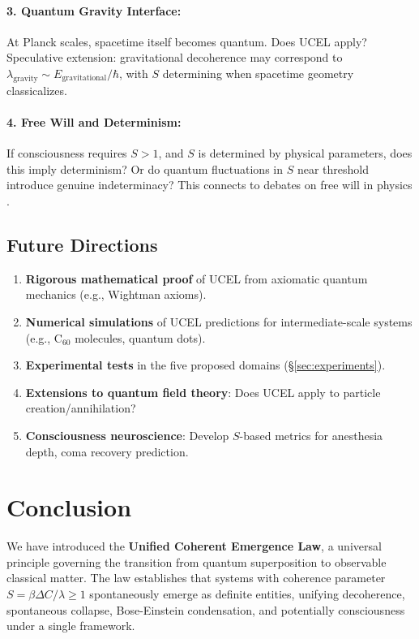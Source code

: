 \documentclass[12pt,a4paper]{article}
\begin{document}
\paragraph{3. Quantum Gravity Interface:}
At Planck scales, spacetime itself becomes quantum. Does UCEL apply? Speculative extension: gravitational decoherence \citep{penrose1996} may correspond to $\lambda_{\text{gravity}} \sim E_{\text{gravitational}} / \hbar$, with $S$ determining when spacetime geometry classicalizes.

\paragraph{4. Free Will and Determinism:}
If consciousness requires $S > 1$, and $S$ is determined by physical parameters, does this imply determinism? Or do quantum fluctuations in $S$ near threshold introduce genuine indeterminacy? This connects to debates on free will in physics \citep{conway2006}.

\subsection{Future Directions}

\begin{enumerate}
    \item \textbf{Rigorous mathematical proof} of UCEL from axiomatic quantum mechanics (e.g., Wightman axioms).
    \item \textbf{Numerical simulations} of UCEL predictions for intermediate-scale systems (e.g., C$_{60}$ molecules, quantum dots).
    \item \textbf{Experimental tests} in the five proposed domains (\S\ref{sec:experiments}).
    \item \textbf{Extensions to quantum field theory}: Does UCEL apply to particle creation/annihilation?
    \item \textbf{Consciousness neuroscience}: Develop $S$-based metrics for anesthesia depth, coma recovery prediction.
\end{enumerate}

\section{Conclusion}

We have introduced the \textbf{Unified Coherent Emergence Law}, a universal principle governing the transition from quantum superposition to observable classical matter. The law establishes that systems with coherence parameter $S = \beta \Delta C / \lambda \geq 1$ spontaneously emerge as definite entities, unifying decoherence, spontaneous collapse, Bose-Einstein condensation, and potentially consciousness under a single framework.
\end{document}
